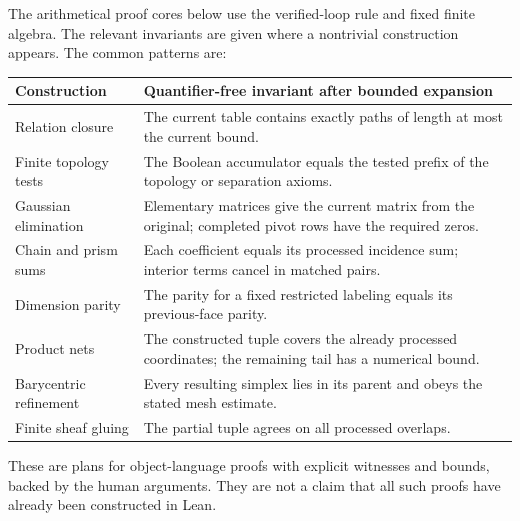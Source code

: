The arithmetical proof cores below use the verified-loop rule and fixed finite algebra. The relevant invariants are given where a nontrivial construction appears. The common patterns are:
\begin{center}
\begin{tabular}{P{.29\textwidth}P{.60\textwidth}}
\toprule
Construction & Quantifier-free invariant after bounded expansion\\
\midrule
Relation closure & The current table contains exactly paths of length at most the current bound.\\
Finite topology tests & The Boolean accumulator equals the tested prefix of the topology or separation axioms.\\
Gaussian elimination & Elementary matrices give the current matrix from the original; completed pivot rows have the required zeros.\\
Chain and prism sums & Each coefficient equals its processed incidence sum; interior terms cancel in matched pairs.\\
Dimension parity & The parity for a fixed restricted labeling equals its previous-face parity.\\
Product nets & The constructed tuple covers the already processed coordinates; the remaining tail has a numerical bound.\\
Barycentric refinement & Every resulting simplex lies in its parent and obeys the stated mesh estimate.\\
Finite sheaf gluing & The partial tuple agrees on all processed overlaps.\\
\bottomrule
\end{tabular}
\end{center}
These are plans for object-language proofs with explicit witnesses and bounds, backed by the human arguments. They are not a claim that all such proofs have already been constructed in Lean.

